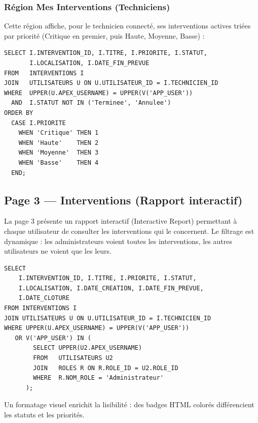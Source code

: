 \documentclass[12pt,a4paper,oneside]{report}
\begin{document}
\subsubsection{Région Mes Interventions (Techniciens)}

Cette région affiche, pour le technicien connecté, ses interventions actives triées par priorité (Critique en premier, puis Haute, Moyenne, Basse) :

\begin{lstlisting}[language=PLSQL, caption=Requête SQL de la région Mes Interventions]
SELECT I.INTERVENTION_ID, I.TITRE, I.PRIORITE, I.STATUT,
       I.LOCALISATION, I.DATE_FIN_PREVUE
FROM   INTERVENTIONS I
JOIN   UTILISATEURS U ON U.UTILISATEUR_ID = I.TECHNICIEN_ID
WHERE  UPPER(U.APEX_USERNAME) = UPPER(V('APP_USER'))
  AND  I.STATUT NOT IN ('Terminee', 'Annulee')
ORDER BY
  CASE I.PRIORITE
    WHEN 'Critique' THEN 1
    WHEN 'Haute'    THEN 2
    WHEN 'Moyenne'  THEN 3
    WHEN 'Basse'    THEN 4
  END;
\end{lstlisting}

\subsection{Page 3 — Interventions (Rapport interactif)}

La page 3 présente un rapport interactif (Interactive Report) permettant à chaque utilisateur de consulter les interventions qui le concernent. Le filtrage est dynamique : les administrateurs voient toutes les interventions, les autres utilisateurs ne voient que les leurs.

\begin{lstlisting}[language=PLSQL, caption=Requête SQL principale de la page Interventions]
SELECT
    I.INTERVENTION_ID, I.TITRE, I.PRIORITE, I.STATUT,
    I.LOCALISATION, I.DATE_CREATION, I.DATE_FIN_PREVUE,
    I.DATE_CLOTURE
FROM INTERVENTIONS I
JOIN UTILISATEURS U ON U.UTILISATEUR_ID = I.TECHNICIEN_ID
WHERE UPPER(U.APEX_USERNAME) = UPPER(V('APP_USER'))
   OR V('APP_USER') IN (
        SELECT UPPER(U2.APEX_USERNAME)
        FROM   UTILISATEURS U2
        JOIN   ROLES R ON R.ROLE_ID = U2.ROLE_ID
        WHERE  R.NOM_ROLE = 'Administrateur'
      );
\end{lstlisting}

Un formatage visuel enrichit la lisibilité : des badges HTML colorés différencient les statuts et les priorités.
\end{document}
